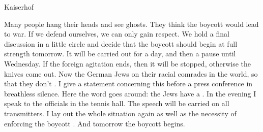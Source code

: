 Kaiserhof

Many people hang their heads and see ghosts. They think the boycott would lead to war. If we defend ourselves, we can only gain respect. We hold a final discussion in a little circle and decide that the boycott should begin at full strength tomorrow. It will be carried out for a day, and then a pause until Wednesday. If the foreign agitation ends, then it will be stopped, otherwise the knives come out. Now the German Jews  on their racial comrades in the world, so that they don't . I give a statement concerning this before a press conference in breathless silence. Here the word goes around: the Jews have a . In the evening I speak to the officials in the tennis hall. The speech will be carried on all transmitters. I lay out the whole situation again as well as the necessity of enforcing the boycott . And tomorrow the boycott begins.